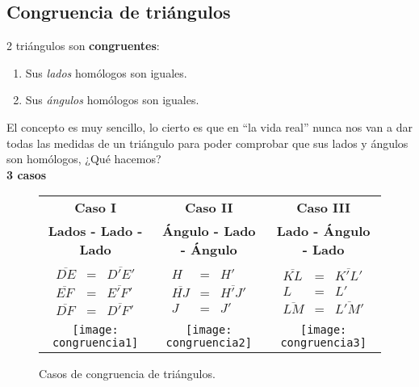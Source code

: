 \subsection{Congruencia de triángulos}

2 triángulos son \textbf{congruentes}:
\begin{enumerate}[label=\alph*)]
	\item Sus \textit{lados} homólogos son iguales.
	\item Sus \textit{ángulos} homólogos son iguales.
\end{enumerate}


El concepto es muy sencillo, lo cierto es que en ``la vida real'' nunca nos
van a dar todas las medidas de un triángulo para poder comprobar que sus lados
y ángulos son homólogos, ¿Qué hacemos?\\

\textbf{\large3 casos}

\begin{figure*}[h!]
\def\arraystretch{1.5}%
\caption[congruencia]{Casos de congruencia de triángulos. }
\label{congruencia}
\begin{tabular}{c  c  c }
	\textbf{Caso I} & 
	\textbf{Caso II} & 
	\textbf{Caso III}                       
	\\
	\textbf{Lados - Lado - Lado} & 
	\textbf{Ángulo - Lado - Ángulo} & 
	\textbf{Lado - Ángulo - Lado}                       
	\\
	$\begin{array} {lcl} 
		\overline{DE} & = & \overline{D'E'} \\ 
		\overline{EF} & = & \overline{E'F'} \\
		\overline{DF} & = & \overline{D'F'} 
	\end{array}$ &
	$\begin{array} {lcl} 
		H & = & H' \\ 
		\overline{HJ} & = & \overline{H'J'} \\
		J & = & J' 
	\end{array}$ &
	$\begin{array} {lcl} 
		\overline{KL} & = & \overline{K'L'} \\ 
		L & = & L' \\ 
		\overline{LM} & = & \overline{L'M'} 
	\end{array}$
	\\
	\texttt{[image: congruencia1]} & 
	\texttt{[image: congruencia2]}  & 
	\texttt{[image: congruencia3]} 
	
\end{tabular}
\end{figure*}

